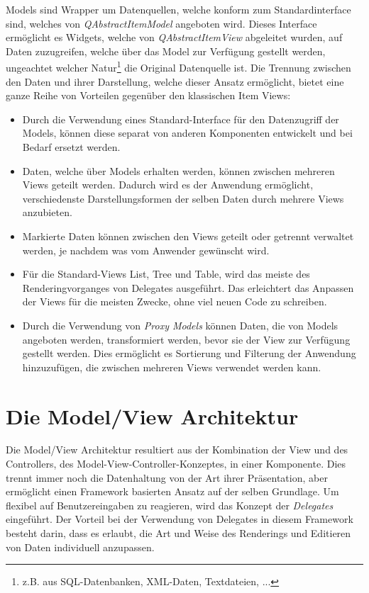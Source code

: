 \documentclass[11pt,a4paper,titlepage]{scrreprt}
\begin{document}
Models sind Wrapper um Datenquellen, welche konform zum Standardinterface sind, welches
von {\itshape QAbstractItemModel} angeboten wird. Dieses Interface ermöglicht es Widgets,
welche von {\itshape QAbstractItemView} abgeleitet wurden, auf Daten zuzugreifen, welche 
über das Model zur Verfügung gestellt werden, ungeachtet welcher Natur\footnote{z.B.
aus SQL-Datenbanken, XML-Daten, Textdateien, ...} die Original Datenquelle ist.
Die Trennung zwischen den Daten und ihrer Darstellung, welche dieser Ansatz ermöglicht,
bietet eine ganze Reihe von Vorteilen gegenüber den klassischen Item Views:
\begin{itemize}
\item Durch die Verwendung eines Standard-Interface für den Datenzugriff der Models,
können diese separat von anderen Komponenten entwickelt und bei Bedarf ersetzt werden.
\item Daten, welche über Models erhalten werden, können zwischen mehreren Views geteilt werden.
Dadurch wird es der Anwendung ermöglicht, verschiedenste Darstellungsformen der selben Daten
durch mehrere Views anzubieten.
\item Markierte Daten können zwischen den Views geteilt oder getrennt verwaltet werden, je
nachdem was vom Anwender gewünscht wird.
\item Für die Standard-Views List, Tree und Table, wird das meiste des Renderingvorganges von
Delegates ausgeführt. Das erleichtert das Anpassen der Views für die meisten Zwecke, ohne
viel neuen Code zu schreiben.
\item Durch die Verwendung von {\itshape Proxy Models} können Daten, die von Models angeboten
werden, transformiert werden, bevor sie der View zur Verfügung gestellt werden. Dies ermöglicht
es Sortierung und Filterung der Anwendung hinzuzufügen, die zwischen mehreren Views verwendet
werden kann.
\end{itemize}

\section{Die Model/View Architektur}
Die Model/View Architektur resultiert aus der Kombination der View und des Controllers,
des Model-View-Controller-Konzeptes, in einer Komponente. Dies trennt immer noch die
Datenhaltung von der Art ihrer Präsentation, aber ermöglicht einen Framework basierten
Ansatz auf der selben Grundlage. Um flexibel auf Benutzereingaben zu reagieren, wird das
Konzept der {\itshape Delegates} eingeführt. Der Vorteil bei der Verwendung von Delegates
in diesem Framework besteht darin, dass es erlaubt, die Art und Weise des Renderings und Editieren
von Daten individuell anzupassen.{\medskip}
\end{document}
